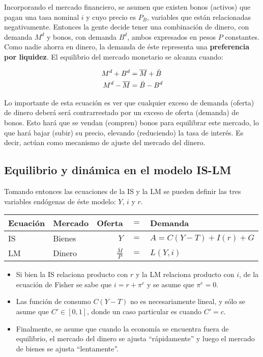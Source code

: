 \documentclass[DeGregorioResumen]{subfiles}
\begin{document}
Incorporando el mercado financiero, se asumen que existen bonos (activos) que pagan una tasa nominal $i$ y cuyo precio es $P_B$, variables que están relacionadas negativamente. Entonces la gente decide tener una combinación de dinero, con demanda $M^d$ y bonos, con demanda $B^d$, ambos expresados en pesos $P$ constantes. Como nadie ahorra en dinero, la demanda de éste representa una \textbf{preferencia por liquidez}. El equilibrio del mercado monetario se alcanza cuando:

\begin{align}
M^d + B^d &= \overline{M} + \bar{B} \\
M^d - \overline{M} &= \bar{B} - B^d \notag
\end{align}

Lo importante de esta ecuación es ver que cualquier exceso de demanda (oferta) de dinero deberá será contrarrestado por un exceso de oferta (demanda) de bonos. Esto hará que se vendan (compren) bonos para equilibrar este mercado, lo que hará bajar (subir) su precio, elevando (reduciendo) la tasa de interés. Es decir, actúan como mecanismo de ajuste del mercado del dinero.

\subsection{Equilibrio y dinámica en el modelo IS-LM}

Tomando entonces las ecuaciones de la IS y la LM se pueden definir las tres variables endógenas de éste modelo: $Y$, $i$ y $r$.

\begin{center}
\begin{tabular}{llrcl}
  Ecuación & Mercado & Oferta &$=$& Demanda \\
  \midrule
  IS & Bienes & $Y$ &$=$& $A = C(Y-T)+I(r)+G$ \\
  LM & Dinero & $\frac{\overline{M}}{P}$ &$=$& $L(Y,i)$ \\
\end{tabular}
\end{center}


\begin{itemize}
\item Si bien la IS relaciona producto con $r$ y la LM relaciona producto con $i$, de la ecuación de Fisher se sabe que $i=r+\pi^e$ y se asume que $\pi^e=0$.
\item Las función de consumo $C(Y-T)$ no es necesariamente lineal, y sólo se asume que $C' \in [0,1]$, donde un caso particular es cuando $C'=c$.
\item Finalmente, se asume que cuando la economía se encuentra fuera de equilibrio, el mercado del dinero se ajusta ``rápidamente'' y luego el mercado de bienes se ajusta ``lentamente''.
\end{itemize}
\end{document}
